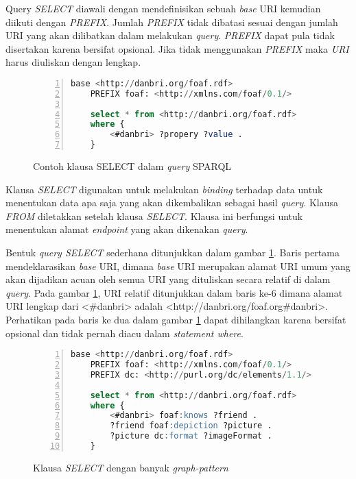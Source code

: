 Query \emph{SELECT} diawali dengan mendefinisikan sebuah \emph{base} URI kemudian diikuti dengan \emph{PREFIX}. Jumlah \emph{PREFIX} tidak dibatasi sesuai dengan jumlah URI yang akan dilibatkan dalam melakukan \emph{query}. \emph{PREFIX} dapat pula tidak disertakan karena bersifat opsional. Jika tidak menggunakan \emph{PREFIX} maka \emph{URI} harus diuliskan dengan lengkap.

\begin{figure}[hb]
	\centering
	\begin{lstlisting}[language=SQL, numbers=left]
	base <http://danbri.org/foaf.rdf>
	PREFIX foaf: <http://xmlns.com/foaf/0.1/>

	select * from <http://danbri.org/foaf.rdf>
	where {
		<#danbri> ?propery ?value .
	}\end{lstlisting}
	\caption{Contoh klausa SELECT dalam \emph{query} SPARQL \citep{liyang_yu}}
	\label{fig:sparql_select_1}
\end{figure}

Klausa \emph{SELECT} digunakan untuk melakukan \emph{binding} terhadap data untuk menentukan data apa saja yang akan dikembalikan sebagai hasil \emph{query}. Klausa \emph{FROM} diletakkan setelah klausa \emph{SELECT}. Klausa ini berfungsi untuk menentukan alamat \emph{endpoint} yang akan dikenakan \emph{query}.

Bentuk \emph{query SELECT} sederhana ditunjukkan dalam gambar \ref{fig:sparql_select_1}. Baris pertama mendeklarasikan \emph{base} URI, dimana \emph{base} URI merupakan alamat URI umum yang akan dijadikan acuan oleh semua URI yang dituliskan secara relatif di dalam \emph{query}. Pada gambar \ref{fig:sparql_select_1}, URI relatif ditunjukkan dalam baris ke-6 dimana alamat URI lengkap dari <\#danbri> adalah <http://danbri.org/foaf.org\#danbri>. Perhatikan pada baris ke dua dalam gambar \ref{fig:sparql_select_1} dapat dihilangkan karena bersifat opsional dan tidak pernah diacu dalam \emph{statement where}.

\begin{figure}[hb]
	\centering
	\begin{lstlisting}[language=SQL,numbers=left]
	base <http://danbri.org/foaf.rdf>
	PREFIX foaf: <http://xmlns.com/foaf/0.1/>
	PREFIX dc: <http://purl.org/dc/elements/1.1/>

	select * from <http://danbri.org/foaf.rdf>
	where {
		<#danbri> foaf:knows ?friend .
		?friend foaf:depiction ?picture .
		?picture dc:format ?imageFormat .
	}\end{lstlisting}
	\caption{Klausa \emph{SELECT} dengan banyak \emph{graph-pattern} \citep{liyang_yu}}
	\label{fig:sparql_select_2}
\end{figure}


